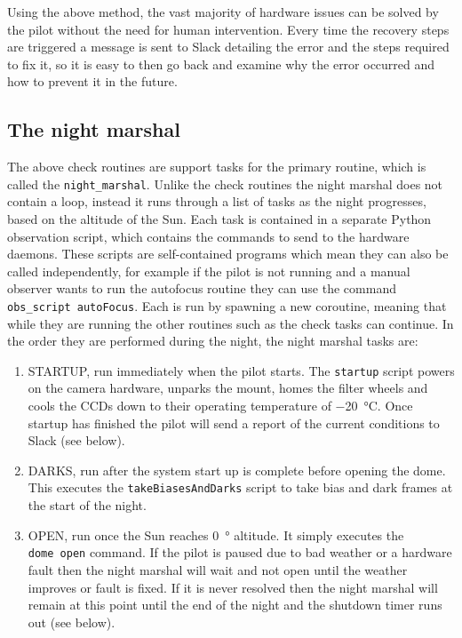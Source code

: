 \begin{colsection}
\begin{colsection}
Using the above method, the vast majority of hardware issues can be solved by the pilot without the need for human intervention. Every time the recovery steps are triggered a message is sent to Slack detailing the error and the steps required to fix it, so it is easy to then go back and examine why the error occurred and how to prevent it in the future.

\end{colsection}

\subsection{The night marshal}
\label{sec:night_marshal}
\begin{colsection}

The above check routines are support tasks for the primary routine, which is called the \texttt{night\_marshal}. Unlike the check routines the night marshal does not contain a loop, instead it runs through a list of tasks as the night progresses, based on the altitude of the Sun. Each task is contained in a separate Python observation script, which contains the commands to send to the hardware daemons. These scripts are self-contained programs which mean they can also be called independently, for example if the pilot is not running and a manual observer wants to run the autofocus routine they can use the command \texttt{obs\_script~autoFocus}. Each is run by spawning a new coroutine, meaning that while they are running the other routines such as the check tasks can continue. In the order they are performed during the night, the night marshal tasks are:

\begin{enumerate}

\item STARTUP, run immediately when the pilot starts. The \texttt{startup} script powers on the camera hardware, unparks the mount, homes the filter wheels and cools the CCDs down to their operating temperature of \SI{-20}{\celsius}. Once startup has finished the pilot will send a report of the current conditions to Slack (see  below).

\item DARKS, run after the system start up is complete before opening the dome. This executes the \texttt{takeBiasesAndDarks} script to take bias and dark frames at the start of the night. 

\item OPEN, run once the Sun reaches \SI{0}{\degree} altitude. It simply executes the \texttt{dome~open} command. If the pilot is paused due to bad weather or a hardware fault then the night marshal will wait and not open until the weather improves or fault is fixed. If it is never resolved then the night marshal will remain at this point until the end of the night and the shutdown timer runs out (see below).


\end{enumerate}
\end{colsection}
\end{colsection}
